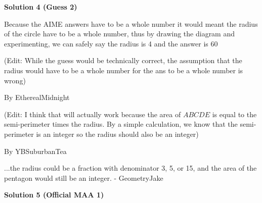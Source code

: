 \begin{enumerate}
 



\textbf{Solution 4 (Guess 2)}

Because the AIME answers have to be a whole number it would meant the radius of the circle have to be a whole number, thus by drawing the diagram and experimenting, we can safely say the radius is 4 and the answer is 60

 (Edit: While the guess would be technically correct, the assumption that the radius would have to be a whole number for the ans to be a whole number is wrong)

 By EtherealMidnight

 (Edit: I think that will actually work because the area of $ABCDE$ is equal to the semi-perimeter times the radius. By a simple calculation, we know that the semi-perimeter is an integer so the radius should also be an integer)

 By YBSuburbanTea

 ...the radius could be a fraction with denominator 3, 5, or 15, and the area of the pentagon would still be an integer. - GeometryJake

 



\textbf{Solution 5 (Official MAA 1)}


\end{enumerate}
